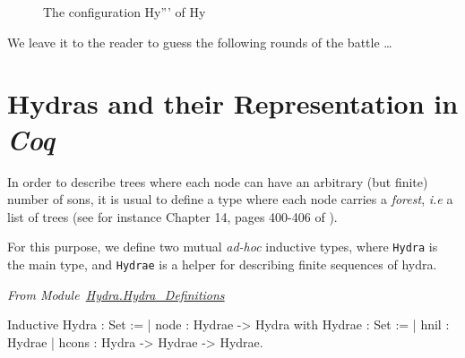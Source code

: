 \begin{figure}[hp]
\caption{The configuration Hy''' of Hy \label{fig:Hy5}}
\end{figure}
\FloatBarrier

We leave it to the reader  to guess the following  rounds of the battle \dots



\section{Hydras and their Representation in \emph{Coq}}
\label{sec:orgheadline48}


In order to describe trees where each node can have an arbitrary (but finite) number of sons, it is usual to define a type where each node carries a \emph{forest}, \emph{i.e} a list of trees
(see for instance Chapter 14, pages 400-406 of \cite{BC04}).

For this purpose, we define two mutual \emph{ad-hoc}  inductive types, where \texttt{Hydra} is the main type, and \texttt{Hydrae} is a helper for describing finite sequences of hydra.
\label{types:Hydra}
\label{types:Hydrae}

\vspace{4pt}
\noindent
\emph{From Module~\href{../theories/html/hydras.Hydra.Hydra_Definitions.html\#Hydra}{Hydra.Hydra\_Definitions}}

\begin{Coqsrc}
Inductive Hydra : Set :=
| node :  Hydrae -> Hydra
with Hydrae : Set :=
| hnil : Hydrae
| hcons : Hydra -> Hydrae -> Hydrae.
\end{Coqsrc}

